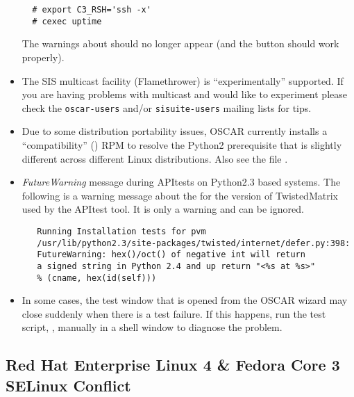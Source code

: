 \begin{itemize}
\begin{verbatim}
  # export C3_RSH='ssh -x'
  # cexec uptime
\end{verbatim}

  The warnings about  should no longer appear (and the
   button should work properly).

\item The SIS multicast facility (Flamethrower) is ``experimentally''
  supported.  If you are having problems with multicast and would like
  to experiment please check the {\tt oscar-users} and/or
  {\tt sisuite-users} mailing lists for tips.

\item Due to some distribution portability issues, OSCAR currently installs
  a ``compatibility''  () RPM to resolve the
  Python2 prerequisite that is slightly different across different Linux
  distributions.  Also see the file .

\item \emph{FutureWarning} message during APItests on Python2.3 based systems.
   The following is a warning message about the for the version of
   TwistedMatrix used by the APItest tool.  It is only a warning and can be
   ignored.
   \begin{small}
   \begin{verbatim}
   Running Installation tests for pvm
   /usr/lib/python2.3/site-packages/twisted/internet/defer.py:398:
   FutureWarning: hex()/oct() of negative int will return
   a signed string in Python 2.4 and up return "<%s at %s>" 
   % (cname, hex(id(self)))
   \end{verbatim}
   \end{small}

\item In some cases, the test window that is opened from the
  OSCAR wizard may close suddenly when there is a test failure. If
  this happens, run the test script, ,
  manually in a shell window to diagnose the problem.

\end{itemize}


\subsection{Red Hat Enterprise Linux 4 \& Fedora Core 3 SELinux Conflict }
\label{subsec:SELinuxnotes}

